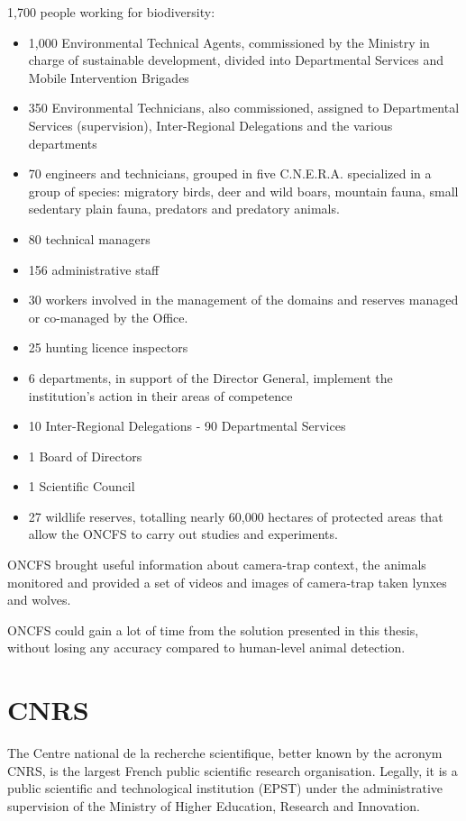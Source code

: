 1,700 people working for biodiversity:
\begin{itemize}
  \item 1,000 Environmental Technical Agents, commissioned by the Ministry in charge of sustainable development, divided into Departmental Services and Mobile Intervention Brigades
  \item 350 Environmental Technicians, also commissioned, assigned to Departmental Services (supervision), Inter-Regional Delegations and the various departments
  \item 70 engineers and technicians, grouped in five C.N.E.R.A. specialized in a group of species: migratory birds, deer and wild boars, mountain fauna, small sedentary plain fauna, predators and predatory animals.
  \item 80 technical managers
  \item 156 administrative staff
  \item 30 workers involved in the management of the domains and reserves managed or co-managed by the Office.
  \item 25 hunting licence inspectors
  \item 6 departments, in support of the Director General, implement the institution's action in their areas of competence
  \item 10 Inter-Regional Delegations - 90 Departmental Services
  \item 1 Board of Directors
  \item 1 Scientific Council
  \item 27 wildlife reserves, totalling nearly 60,000 hectares of protected areas that allow the ONCFS to carry out studies and experiments.
\end{itemize}

ONCFS brought useful information about camera-trap context, the animals monitored and provided a set of videos and images of camera-trap taken lynxes and wolves.

ONCFS could gain a lot of time from the solution presented in this thesis, without losing any accuracy compared to human-level animal detection.

\pagebreak\section{CNRS}

The Centre national de la recherche scientifique, better known by the acronym CNRS, is the largest French public scientific research organisation. Legally, it is a public scientific and technological institution (EPST) under the administrative supervision of the Ministry of Higher Education, Research and Innovation.

